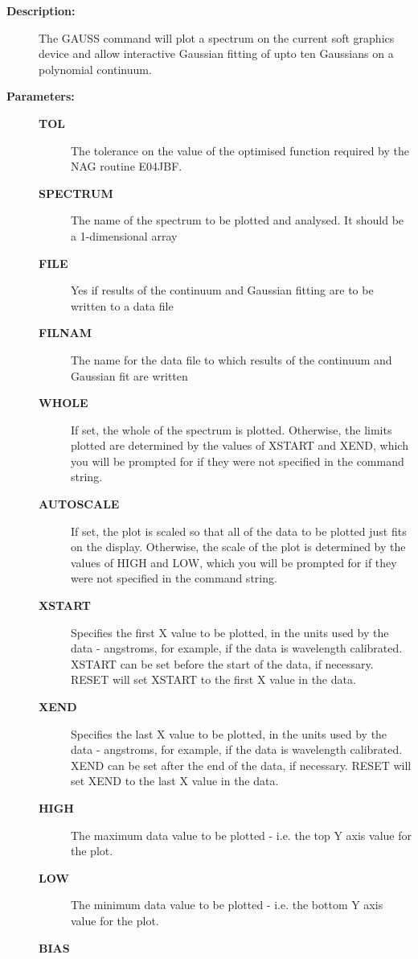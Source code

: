 \begin{description}
\begin{description}
\item [\textbf{Description:}]
 The GAUSS command will plot a spectrum on the current
 soft graphics device and allow interactive Gaussian
 fitting of upto ten Gaussians on a polynomial continuum.

\item [\textbf{Parameters:}]
\begin{description}
\item [\textbf{TOL}]
 The tolerance on the value of the optimised function
 required by the NAG routine E04JBF.
\item [\textbf{SPECTRUM}]
 The name of the spectrum to be plotted and analysed.
 It should be a 1-dimensional array
\item [\textbf{FILE}]
 Yes if results of the continuum and Gaussian fitting
 are to be written to a data file
\item [\textbf{FILNAM}]
 The name for the data file to which results of the
 continuum and Gaussian fit are written
\item [\textbf{WHOLE}]
 If set, the whole of the spectrum is plotted.
 Otherwise, the limits plotted are determined by the
 values of XSTART and XEND, which you will be prompted
 for if they were not specified in the command string.
\item [\textbf{AUTOSCALE}]
 If set, the plot is scaled so that all of the data
 to be plotted just fits on the display.  Otherwise, the
 scale of the plot is determined by the values of HIGH and
 LOW, which you will be prompted for if they were not
 specified in the command string.
\item [\textbf{XSTART}]
 Specifies the first X value to be plotted, in the
 units used by the data - angstroms, for example, if the
 data is wavelength calibrated.  XSTART can be set before
 the start of the data, if necessary.  RESET will set
 XSTART to the first X value in the data.
\item [\textbf{XEND}]
 Specifies the last X value to be plotted, in the units
 used by the data - angstroms, for example, if the data
 is wavelength calibrated.  XEND can be set after the end
 of the data, if necessary. RESET will set XEND to the last
 X value in the data.
\item [\textbf{HIGH}]
 The maximum data value to be plotted - i.e. the top Y axis
 value for the plot.
\item [\textbf{LOW}]
 The minimum data value to be plotted - i.e. the bottom Y axis
 value for the plot.
\item [\textbf{BIAS}]

\end{description}
\end{description}
\end{description}
